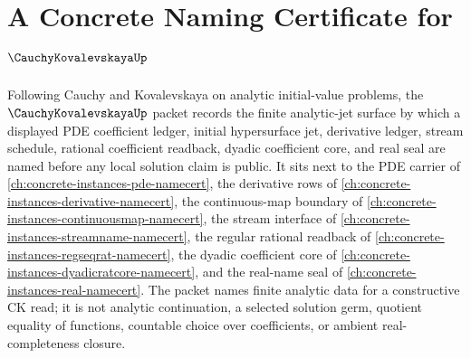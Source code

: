 \chapter{A Concrete Naming Certificate for $\CauchyKovalevskayaUp$}
\label{ch:concrete-instances-cauchy-kovalevskaya-namecert}

Following Cauchy and Kovalevskaya on analytic initial-value problems, the $\CauchyKovalevskayaUp$ packet records the finite analytic-jet surface by which a displayed PDE coefficient ledger, initial hypersurface jet, derivative ledger, stream schedule, rational coefficient readback, dyadic coefficient core, and real seal are named before any local solution claim is public. It sits next to the PDE carrier of \autoref{ch:concrete-instances-pde-namecert}, the derivative rows of \autoref{ch:concrete-instances-derivative-namecert}, the continuous-map boundary of \autoref{ch:concrete-instances-continuousmap-namecert}, the stream interface of \autoref{ch:concrete-instances-streamname-namecert}, the regular rational readback of \autoref{ch:concrete-instances-regseqrat-namecert}, the dyadic coefficient core of \autoref{ch:concrete-instances-dyadicratcore-namecert}, and the real-name seal of \autoref{ch:concrete-instances-real-namecert}. The packet names finite analytic data for a constructive CK read; it is not analytic continuation, a selected solution germ, quotient equality of functions, countable choice over coefficients, or ambient real-completeness closure.

